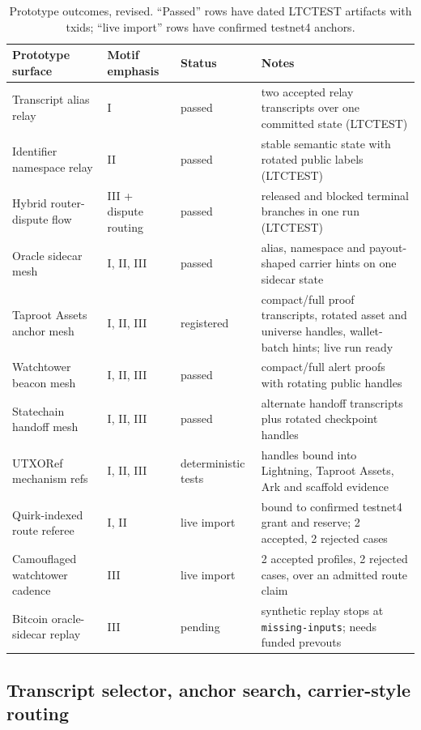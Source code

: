 \documentclass[11pt]{article}
\begin{document}
\begin{table}[t]
\centering
\small
\begin{tabular}{L{3.4cm}L{2.9cm}L{1.6cm}L{5.8cm}}
\toprule
Prototype surface & Motif emphasis & Status & Notes \\
\midrule
Transcript alias relay & I & passed & two accepted relay transcripts over one committed state (LTCTEST) \\
Identifier namespace relay & II & passed & stable semantic state with rotated public labels (LTCTEST) \\
Hybrid router-dispute flow & III + dispute routing & passed & released and blocked terminal branches in one run (LTCTEST) \\
Oracle sidecar mesh & I, II, III & passed & alias, namespace and payout-shaped carrier hints on one sidecar state \\
Taproot Assets anchor mesh & I, II, III & registered & compact/full proof transcripts, rotated asset and universe handles, wallet-batch hints; live run ready \\
Watchtower beacon mesh & I, II, III & passed & compact/full alert proofs with rotating public handles \\
Statechain handoff mesh & I, II, III & passed & alternate handoff transcripts plus rotated checkpoint handles \\
UTXORef mechanism refs & I, II, III & deterministic tests & handles bound into Lightning, Taproot Assets, Ark and scaffold evidence \\
Quirk-indexed route referee & I, II & live import & bound to confirmed testnet4 grant and reserve; 2 accepted, 2 rejected cases \\
Camouflaged watchtower cadence & III & live import & 2 accepted profiles, 2 rejected cases, over an admitted route claim \\
Bitcoin oracle-sidecar replay & III & pending & synthetic replay stops at \texttt{missing-inputs}; needs funded prevouts \\
\bottomrule
\end{tabular}
\caption{Prototype outcomes, revised. ``Passed'' rows have dated LTCTEST
artifacts with txids; ``live import'' rows have confirmed testnet4 anchors.}
\label{tab:prototype-results}
\end{table}

\subsection{Transcript selector, anchor search, carrier-style routing}
\end{document}
